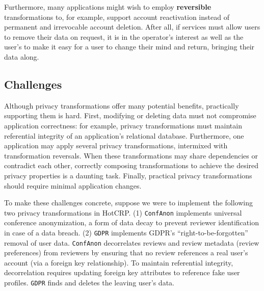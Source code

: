 Furthermore, many applications might wish to employ \textbf{reversible} transformations to, for
example, support account reactivation instead of permanent and irrevocable account deletion.
%
After all, if services must allow users to remove their data on request, it is in the operator's
interest as well as the user's to make it easy for a user to change their mind and return, bringing
their data along.
%
%
%
%

%
%

\subsection{Challenges}
%
Although privacy transformations offer many potential benefits, practically supporting them is hard.
First, modifying or deleting data must not compromise application correctness: for example, privacy
transformations must maintain referential integrity of an application's relational database.
%
Furthermore, one application may apply several privacy transformations, intermixed with
transformation reversals.  When these transformations may share dependencies or contradict each
other, correctly composing transformations to achieve the desired privacy properties is a daunting
task.
%
Finally, practical privacy transformations should require minimal application changes.
%

%
To make these challenges concrete, suppose we were to implement the following two privacy
transformations in HotCRP. 
%
(1) \texttt{ConfAnon} implements universal conference anonymization, a form of data decay to
prevent reviewer identification in case of a data breach.
%
(2) \texttt{GDPR} implements GDPR's ``right-to-be-forgotten'' removal of user data.
%
\texttt{ConfAnon} decorrelates reviews and review metadata (\eg review preferences) from reviewers
by ensuring that no review references a real user's account (via a foreign key relationship).
To maintain referential integrity, decorrelation requires updating foreign key
attributes to reference fake user profiles.
\texttt{GDPR} finds and deletes the leaving user's data.
%

